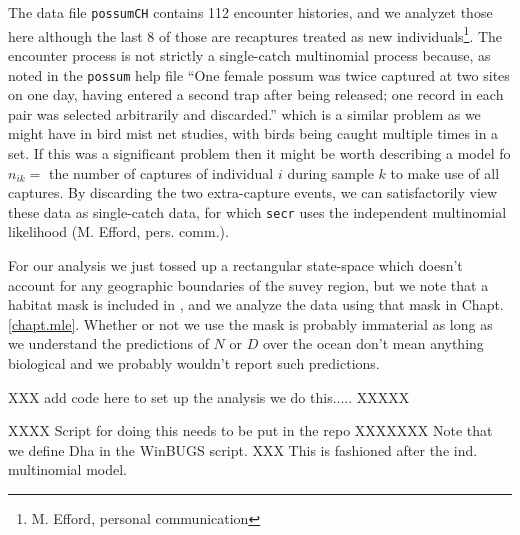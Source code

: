 The data file \mbox{\tt possumCH} contains 112 encounter histories,
and we analyzet those here although the last 8 of those are recaptures
treated as new individuals\footnote{M. Efford, personal communication}.
The encounter process is not strictly a single-catch multinomial process because,
as noted in the \mbox{\tt possum} help file
 ``One female possum was twice captured at two
sites on one day, having entered a second trap after being released;
one record in each pair was selected arbitrarily and discarded.''
which is a similar problem as we might have in bird mist net studies,
with birds being caught multiple times in a set.
If this was a significant problem then it might be worth describing a
model fo $n_{ik} = $ the number of captures of individual $i$ during
sample $k$ to make use of all captures. By discarding the two
extra-capture events, we can satisfactorily view these data as
single-catch data, for which \mbox{\tt secr} uses the independent
multinomial likelihood (M. Efford, pers. comm.).

For our analysis we just tossed up a rectangular state-space which
doesn't account for any geographic boundaries of the suvey region, but
we note that a habitat mask is included in \secr, and we analyze the
data using that mask in Chapt. \ref{chapt.mle}.
Whether or not we use the mask is
probably immaterial as long as we understand the predictions of $N$ or
$D$ over the ocean don't mean anything biological and we probably
wouldn't report such predictions.

XXX add code here
to set up the analysis we do this.....
XXXXX

XXXX Script for doing this needs to be put in the repo XXXXXXX
Note that we define Dha in the WinBUGS script.
XXX This is fashioned after the ind. multinomial model.

